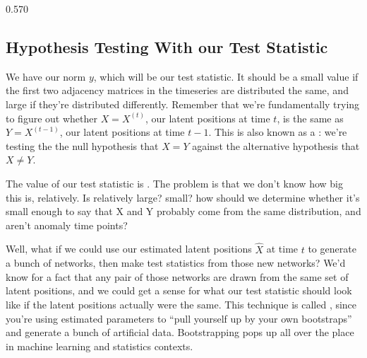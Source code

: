 \documentclass[letterpaper,10pt,english]{jupyterBook}
\begin{document}
\begin{sphinxVerbatim}[commandchars=\\\{\}]
\end{sphinxVerbatim}

\begin{sphinxVerbatim}[commandchars=\\\{\}]
0.570
\end{sphinxVerbatim}


\subsection{Hypothesis Testing With our Test Statistic}
\label{\detokenize{applications/ch10/anomaly-detection:hypothesis-testing-with-our-test-statistic}}
\sphinxAtStartPar
We have our norm \(y\), which will be our test statistic. It should be a small value if the first two adjacency matrices in the timeseries are distributed the same, and large if they’re distributed differently. Remember that we’re fundamentally trying to figure out whether \(X = X^{(t)}\), our latent positions at time \(t\), is the same as \(Y = X^{(t-1)}\), our latent positions at time \(t-1\). This is also known as a : we’re testing the the null hypothesis that \(X = Y\) against the alternative hypothesis that \(X \neq Y\).

\sphinxAtStartPar
The value of our test statistic is . The problem is that we don’t know how big this is, relatively. Is  relatively large? small? how should we determine whether it’s small enough to say that X and Y probably come from the same distribution, and aren’t anomaly time points?

\sphinxAtStartPar
Well, what if we could use our estimated latent positions \(\hat{X}\) at time \(t\) to generate a bunch of networks, then make test statistics from those new networks? We’d know for a fact that any pair of those networks are drawn from the same set of latent positions, and we could get a sense for what our test statistic should look like if the latent positions actually were the same. This technique is called , since you’re using estimated parameters to “pull yourself up by your own bootstraps” and generate a bunch of artificial data. Bootstrapping pops up all over the place in machine learning and statistics contexts.
\end{document}
